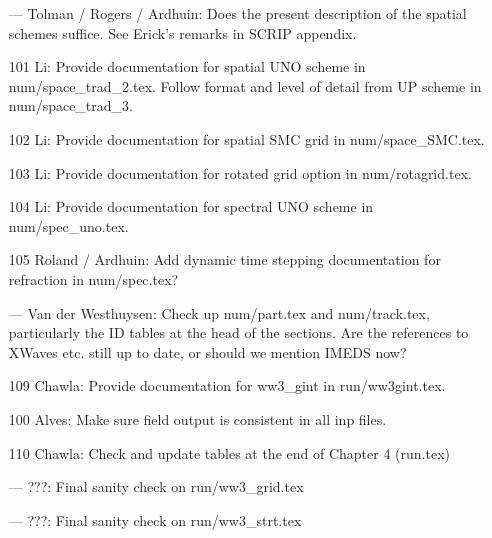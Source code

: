 \begin{itemize}
\item[---] Tolman / Rogers / Ardhuin: Does the present description of the
  spatial schemes suffice. See Erick's remarks in SCRIP appendix.

\item[101] Li: Provide documentation for spatial UNO scheme in
  num/space\_trad\_2.tex. Follow format and level of detail from UP scheme in
  num/space\_trad\_3.

\item[102] Li: Provide documentation for spatial SMC grid in num/space\_SMC.tex.

\item[103] Li: Provide documentation for rotated grid option in
  num/rotagrid.tex.

\item[104] Li: Provide documentation for spectral UNO scheme in
  num/spec\_uno.tex.

\item[105] Roland / Ardhuin: Add dynamic time stepping documentation for
  refraction in num/spec.tex?

\item[---] Van der Westhuysen: Check up num/part.tex and num/track.tex,
  particularly the ID tables at the head of the sections. Are the references to
  XWaves etc. still up to date, or should we mention IMEDS now?




\item[109] Chawla: Provide documentation for ww3\_gint in run/ww3gint.tex.

\item[100] Alves: Make sure field output is consistent in all inp files.

\item[110] Chawla: Check and update tables at the end of Chapter 4 (run.tex)

\item[---] ???: Final sanity check on run/ww3\_grid.tex

\item[---] ???: Final sanity check on run/ww3\_strt.tex


\end{itemize}
